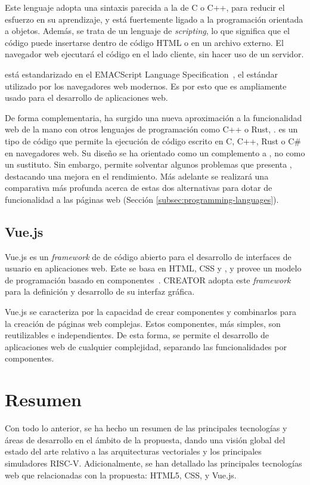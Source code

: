Este lenguaje adopta una sintaxis parecida a la de C o C++, para reducir el esfuerzo en su aprendizaje, y está fuertemente ligado a la programación orientada a objetos. Además, se trata de un lenguaje de \textit{scripting}, lo que significa que el código puede insertarse dentro de código HTML o en un archivo externo. El navegador web ejecutará el código {\js} en el lado cliente, sin hacer uso de un servidor.

{\js} está estandarizado en el EMACScript Language Specification~\cite{EMACScript}, el estándar utilizado por los navegadores web modernos. Es por esto que {\js} es ampliamente usado para el desarrollo de aplicaciones web.

De forma complementaria, ha surgido una nueva aproximación a la funcionalidad web de la mano con otros lenguajes de programación como C++ o Rust, \wa. {\wa} es un tipo de código que permite la ejecución de código escrito en C, C++, Rust o C\# en navegadores web. Su diseño se ha orientado como un complemento a \js, no como un sustituto. Sin embargo, \wa permite solventar algunos problemas que presenta {\js}, destacando una mejora en el rendimiento. Más adelante se realizará una comparativa más profunda acerca de estas dos alternativas para dotar de funcionalidad a las páginas web (Sección \ref{subsec:programming-languages}).

\subsection{Vue.js}
Vue.js es un \textit{framework} de {\js} de código abierto para el desarrollo de interfaces de usuario en aplicaciones web. Este se basa en HTML, CSS y {\js}, y provee un modelo de programación basado en componentes~\cite{vuejs}. CREATOR adopta este \textit{framework} para la definición y desarrollo de su interfaz gráfica.

Vue.js se caracteriza por la capacidad de crear componentes y combinarlos para la creación de páginas web complejas. Estos componentes, más simples, son reutilizables e independientes. De esta forma, se permite el desarrollo de aplicaciones web de cualquier complejidad, separando las funcionalidades por componentes.

\section{Resumen}

Con todo lo anterior, se ha hecho un resumen de las principales tecnologías y áreas de desarrollo en el ámbito de la propuesta, dando una visión global del estado del arte relativo a las arquitecturas vectoriales y los principales simuladores RISC-V. Adicionalmente, se han detallado las principales tecnologías web que relacionadas con la propuesta: HTML5, CSS, {\js} y Vue.js\@.
